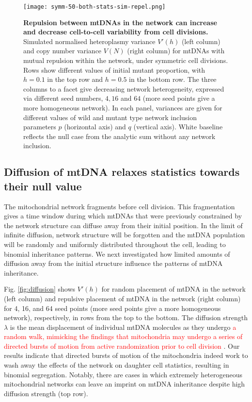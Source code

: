 \documentclass{article}
\begin{document}
\begin{figure}
\centering
\texttt{[image: symm-50-both-stats-sim-repel.png]}
\caption{\textbf{Repulsion between mtDNAs in the network can increase and decrease cell-to-cell variability from cell divisions.} Simulated normalised heteroplasmy variance $V'(h)$ (left column) and copy number variance $V(N)$ (right column) for mtDNAs with mutual repulsion within the network, under symmetric cell divisions. Rows show different values of initial mutant proportion, with $h=0.1$ in the top row and $h=0.5$ in the bottom row. The three columns to a facet give decreasing network heterogeneity, expressed via different seed numbers, $4, 16$ and $64$ (more seed points give a more homogeneous network).  In each panel, variances are given for different values of wild and mutant type network inclusion parameters $p$ (horizontal axis) and $q$ (vertical axis). White baseline reflects the null case from the analytic sum without any network inclusion.}\label{fig:sim-model-compare-rep}
\end{figure}


\subsection{Diffusion of mtDNA relaxes statistics towards their null value}
The mitochondrial network fragments before cell division. This fragmentation gives a time window during which mtDNAs that were previously constrained by the network structure can diffuse away from their initial position. In the limit of infinite diffusion, network structure will be forgotten and the mtDNA population will be randomly and uniformly distributed throughout the cell, leading to binomial inheritance patterns. We next investigated how limited amounts of diffusion away from the initial structure influence the patterns of mtDNA inheritance.

Fig. \ref{fig:diffusion} shows $V'(h)$ for random placement of mtDNA in the network (left column) and repulsive placement of mtDNA in the network (right column) for 4, 16, and 64 seed points (more seed points give a more homogeneous network), respectively, in rows from the top to the bottom. The diffusion strength $\lambda$ is the mean displacement of individual mtDNA molecules as they undergo \textcolor{red}{a random walk, mimicking the findings that mitochondria may undergo a series of directed bursts of motion from active randomization prior to cell division} \citep{moore2021actin}. Our results indicate that directed bursts of motion of the mitochondria indeed work to wash away the effects of the network on daughter cell statistics, resulting in binomial segregation. Notably, there are cases in which extremely heterogeneous mitochondrial networks can leave an imprint on mtDNA inheritance despite high diffusion strength (top row).
\end{document}
